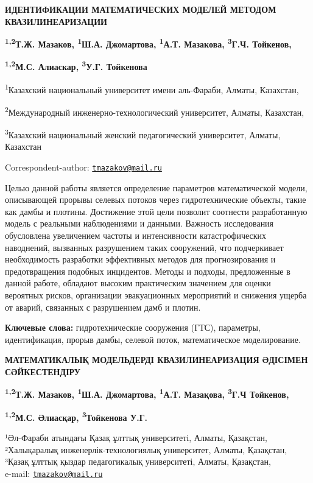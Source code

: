 
{\bfseries ИДЕНТИФИКАЦИИ МАТЕМАТИЧЕСКИХ МОДЕЛЕЙ МЕТОДОМ КВАЗИЛИНЕАРИЗАЦИИ}

{\bfseries \textsuperscript{1,2}Т.Ж. Мазаков\textsuperscript{\envelope },
\textsuperscript{1}Ш.А. Джомартова, \textsuperscript{1}А.Т. Мазакова,
\textsuperscript{3}Г.Ч. Тойкенов,}

{\bfseries \textsuperscript{1,2}М.С. Алиаскар, \textsuperscript{3}У.Г.
Тойкенова}

\textsuperscript{1}Казахский национальный университет имени аль-Фараби,
Алматы, Казахстан,

\textsuperscript{2}Международный инженерно-технологический университет,
Алматы, Казахстан,

\textsuperscript{3}Казахский национальный женский педагогический
университет, Алматы, Казахстан

\raggedright {\bfseries \textsuperscript{\envelope }}Correspondent-author: \href{mailto:tmazakov@mail.ru}{\nolinkurl{tmazakov@mail.ru}}

Целью данной работы является определение параметров математической
модели, описывающей прорывы селевых потоков через гидротехнические
объекты, такие как дамбы и плотины. Достижение этой цели позволит
соотнести разработанную модель с реальными наблюдениями и данными.
Важность исследования обусловлена увеличением частоты и интенсивности
катастрофических наводнений, вызванных разрушением таких сооружений, что
подчеркивает необходимость разработки эффективных методов для
прогнозирования и предотвращения подобных инцидентов. Методы и подходы,
предложенные в данной работе, обладают высоким практическим значением
для оценки вероятных рисков, организации эвакуационных мероприятий и
снижения ущерба от аварий, связанных с разрушением дамб и плотин.

{\bfseries Ключевые слова:} гидротехнические сооружения (ГТС), параметры,
идентификация, прорыв дамбы, селевой поток, математическое
моделирование.

{\bfseries МАТЕМАТИКАЛЫҚ МОДЕЛЬДЕРДІ КВАЗИЛИНЕАРИЗАЦИЯ ӘДІСІМЕН
СӘЙКЕСТЕНДІРУ}

{\bfseries \textsuperscript{1,2}Т.Ж. Мазаков\textsuperscript{\envelope },
\textsuperscript{1}Ш.А. Джомартова, \textsuperscript{1}А.Т. Мазақова,
\textsuperscript{3}Г.Ч Тойкенов,}

{\bfseries \textsuperscript{1,2}М.С. Әлиасқар, \textsuperscript{3}Тойкенова
У.Г.}

¹Әл-Фараби атындағы Қазақ ұлттық университеті, Алматы, Қазақстан,\\
²Халықаралық инженерлік-технологиялық университет, Алматы, Қазақстан,\\
³Қазақ ұлттық қыздар педагогикалық университеті, Алматы, Қазақстан,\\
e-mail: \href{mailto:tmazakov@mail.ru}{\nolinkurl{tmazakov@mail.ru}}

